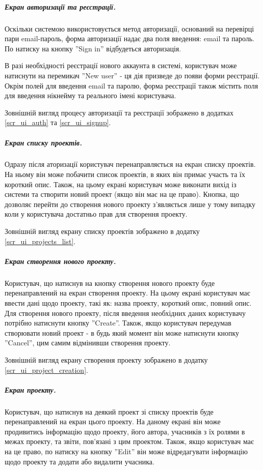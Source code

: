 \documentclass[../main.tex]{subfiles}
\begin{document}
		\subparagraph{Екран авторизації та реєстрації.}
		
			Оскільки системою використовується метод авторизації, оснований на перевірці пари email-пароль, форма авторизації надає два поля введення: email та пароль. По натиску на кнопку ''Sign in'' відбудеться авторизація.
			
			В разі необхідності реєстрації нового аккаунта в системі, користувач може натиснути на перемикач ''New user'' - ця дія призведе до появи форми реєстрації. Окрім полей для введення email та паролю, форма реєстрації також містить поля для введення нікнейму та реального імені користувача.
			
			Зовнішній вигляд процесу авторизації та реєстрації зображено в додатках \ref{scr_ui_auth} та \ref{scr_ui_signup}.
	
		\subparagraph{Екран списку проектів.}
		
			Одразу після аторизації користувач перенаправляється на екран списку проектів. На ньому він може побачити список проектів, в яких він примає участь та їх короткий опис. Також, на цьому екрані користувач може виконати вихід із системи та створити новий проект (якщо він має на це право). Кнопка, що дозволяє перейти до створення нового проекту з'являється лише у тому випадку коли у користувача достатньо прав для створення проекту.
			
			Зовнішній вигляд екрану списку проектів зображено в додатку \ref{scr_ui_projects_list}.
			
		\subparagraph{Екран створення нового проекту.}
		
			Користувач, що натиснув на кнопку створення нового проекту буде перенаправлений на екран створення проекту. На цьому екрані користувач має ввести дані щодо проекту, такі як: назва проекту, короткий опис, повний опис. Для створення нового проекту, після введення необхідних даних користувачу потрібно натиснути кнопку ''Create''. Також, якщо користувач передумав створювати новий проект - в будь який момент він може натиснути кнопку ''Cancel'', цим самим відмінивши створення проекту.
			
			Зовнішній вигляд екрану створення проекту зображено в додатку \ref{scr_ui_project_creation}.
	
		\subparagraph{Екран проекту.}
		
			Користувач, що натиснув на деякий проект зі списку проектів буде перенаправлений на екран цього проекту. На даному екрані він може продивитись інформацію щодо проекту, його автора, учасників з їх ролями в межах проекту, та звіти, пов'язані з цим проектом. Також, якщо користувач має на це право, по натиску на кнопку ''Edit'' він може відредагувати інформацію щодо проекту та додати або видалити учасника.
			
\end{document}
